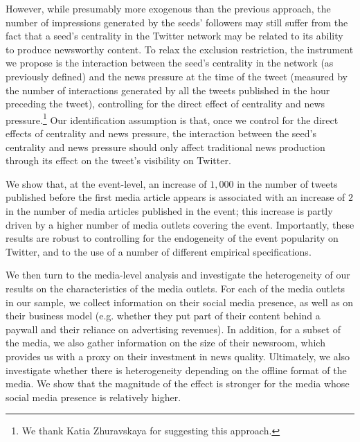 

However, while presumably more exogenous than the previous approach, the number of impressions generated by the seeds' followers may still suffer from the fact that a seed's centrality in the Twitter network may be related to its ability to produce newsworthy content. To relax the exclusion restriction, the instrument we propose is the interaction between the seed's centrality in the network (as previously defined) and the news pressure at the time of the tweet (measured by the number of interactions generated by all the tweets published in the hour preceding the tweet), controlling for the direct effect of centrality and news pressure.\footnote{We thank Katia Zhuravskaya for suggesting this approach.} Our identification assumption is that, once we control for the direct effects of centrality and news pressure, the interaction between the seed's centrality and news pressure should only affect traditional news production through its effect on the tweet's visibility on Twitter.


We show that, at the event-level, an increase of $1,000$ in the number of tweets published before the first media article appears is associated with an increase of $2$ in the number of media articles published in the event; this increase is partly driven by a higher number of media outlets covering the event. Importantly, these results are robust to controlling for the endogeneity of the event popularity on Twitter, and to the use of a number of different empirical specifications.

We then turn to the media-level analysis and investigate the heterogeneity of our results on the characteristics of the media outlets. For each of the media outlets in our sample, we collect information on their social media presence, as well as on their business model (e.g. whether they put part of their content behind a paywall and their reliance on advertising revenues). In addition, for a subset of the media, we also gather information on the size of their newsroom, which provides us with a proxy on their investment in news quality. Ultimately, we also investigate whether there is heterogeneity depending on the offline format of the media. We show that the magnitude of the effect is stronger for the media whose social media presence is relatively higher.

